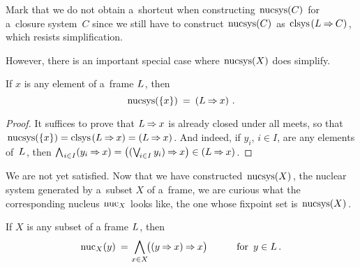 \documentclass[11pt,letterpaper]{article}
\renewcommand{\thmskip}{\bigskip}
\renewcommand{\interskip}{\medskip}
\renewcommand{\inskip}{\smallskip}
\begin{document}
\pagebreak[3]
\thmskip

Mark that we do not obtain a~shortcut when constructing $\mspace{2mu}\mathop{\smash{\mathrm{nucsys}}}\nolimits(C)\mspace{2mu}$
	for a~closure system~$C$
since we still have to construct $\mspace{2mu}\mathop{\smash{\mathrm{nucsys}}}\nolimits(C)\mspace{2mu}$ as $\mspace{2mu}\mathop{\smash{\mathrm{clsys}}}\nolimits\mspace{2mu}(L\mathbin{\Rightarrow} C)\mspace{2mu}$,
	which resists simplification.

However, there is an important special case where $\mspace{2mu}\mathop{\smash{\mathrm{nucsys}}}\nolimits(X)$ does simplify.

\thmskip

\begin{proposition}\label{prop:in-frame-nucsys(x)=(L=>x)}
If $x$ is any element of a~frame $L\mspace{1mu}$, then
%
\begin{equation*}
\mathop{\smash{\mathrm{nucsys}}}\nolimits(\{ x \}) \:=\: (L\mathbin{\Rightarrow} x)~.
\end{equation*}
%
\end{proposition}

\inskip

\begin{proof}
It suffices to prove that $L\mathbin{\Rightarrow} x$ is already closed under all meets,
so that \zerorule$\mspace{2mu}\mathop{\smash{\mathrm{nucsys}}}\nolimits(\{ x \}) = \mathop{\smash{\mathrm{clsys}}}\nolimits\mspace{2mu}(L\mathbin{\Rightarrow} x) = (L\mathbin{\Rightarrow} x)\mspace{1mu}$.
And indeed, if $y_i$, $i\in I$, are any elements of~$L\mspace{1mu}$,
then $\mathop{\textstyle\bigwedge}\nolimits_{\mspace{1mu} i\in I}(y_i\mathbin{\Rightarrow} x)
	= \bigl((\mathop{\textstyle\bigvee}\nolimits_{\!i\in I} y_i)\mathbin{\Rightarrow} x\bigr)
	\in (L\mathbin{\Rightarrow} x)\mspace{1mu}$.
\end{proof}

\pagebreak[3]
\thmskip

We are not yet satisfied.
Now that we have constructed $\mspace{2mu}\mathop{\smash{\mathrm{nucsys}}}\nolimits(X)\mspace{2mu}$,
the nuclear system generated by a~subset $X$ of a~frame,
we are curious what the corresponding nucleus $\mspace{2mu}\mathop{\smash{\mathrm{nuc}}}\nolimits_X$ looks like,
	the one whose fixpoint set is $\mspace{2mu}\mathop{\smash{\mathrm{nucsys}}}\nolimits(X)\mspace{2mu}$.

\thmskip

\begin{proposition}\label{prop:in-frame-nucX(y)=Meet(x-in-X)((y=>x)=>x)}
If\/ $X$ is any subset of a frame\/ $L\mspace{1mu}$, then
%
\begin{equation*}
\mathop{\smash{\mathrm{nuc}}}\nolimits_X(y) \:=\:\! \bigwedge_{x\in X}\!\bigl((y\mathbin{\Rightarrow} x)\mathbin{\Rightarrow} x\bigr)
			\qquad\quad \text{\rm for\, $y\in L$}\,.
\end{equation*}
%
\end{proposition}

\inskip
\end{document}

